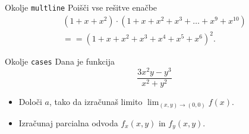 \begin{frame}{Okolje \texttt{multline}}
	Poišči vse rešitve enačbe
	\begin{multline*}
	(1+x+x^2) \cdot (1+x+x^2+x^3+\ldots+x^9+x^{10}) \\= 
	=(1+x+x^2+x^3+x^4+x^5+x^6)^2.
	\end{multline*}
\end{frame}

\begin{frame}{Okolje \texttt{cases}}
	Dana je funkcija
	\begin{equation*}
	 \frac{3x^2y-y^3}{x^2+y^2}
	\end{equation*}	
	\begin{itemize}
		\item Določi $a$, tako da izračunaš limito 
	\( \displaystyle \lim_{(x,y)\to(0,0)} f(x). \)
	\item Izračunaj parcialna odvoda $f_x(x,y)$ in $f_y(x,y)$.
	\end{itemize}
\end{frame}
